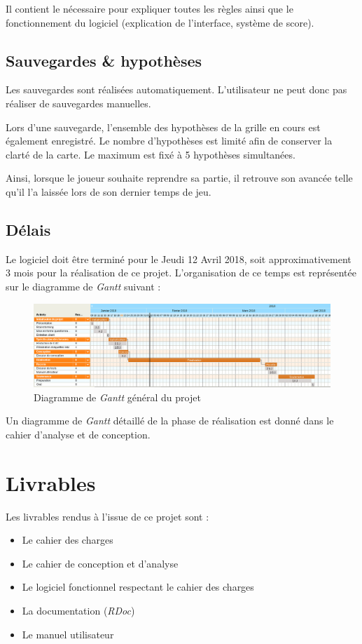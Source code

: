 \documentclass[a4paper, 12pt]{report}
\begin{document}
		Il contient le nécessaire pour expliquer toutes les règles ainsi que le fonctionnement du logiciel (explication de l'interface, système de score).


	\section{Sauvegardes \& hypothèses}
	
		Les sauvegardes sont réalisées automatiquement. L'utilisateur ne peut donc pas réaliser de sauvegardes manuelles. 
		
		Lors d'une sauvegarde, l'ensemble des hypothèses de la grille en cours est également enregistré. Le nombre d'hypothèses est limité afin de conserver la clarté de la carte. Le maximum est fixé à 5 hypothèses simultanées.
		
		Ainsi, lorsque le joueur souhaite reprendre sa partie, il retrouve son avancée telle qu'il l'a laissée lors de son dernier temps de jeu.
	
	\section{Délais}
	
		Le logiciel doit être terminé pour le Jeudi 12 Avril 2018, soit approximativement 3 mois pour la réalisation de ce projet. L'organisation de ce temps est représentée sur le diagramme de \textit{Gantt} suivant :

	\begin{figure}[H]
		\centering
		\caption{Diagramme de \textit{Gantt} général du projet}
		\includegraphics[width=17cm]{ganttGeneral.png}
	\end{figure}	     
		
		Un diagramme de \textit{Gantt} détaillé de la phase de réalisation est donné dans le cahier d'analyse et de conception.

		
\chapter{Livrables}
\vspace*{0.5cm}
	Les livrables rendus à l'issue de ce projet sont :
	\begin{itemize}
	\item Le cahier des charges
	\item Le cahier de conception et d'analyse
	\item Le logiciel fonctionnel respectant le cahier des charges
	\item La documentation (\textit{RDoc})
	\item Le manuel utilisateur
	\end{itemize}
		
		
		
\end{document}
